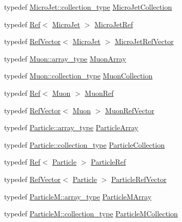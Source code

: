 \begin{DoxyCompactItemize}
\item 
typedef \hyperlink{classpanda_1_1Collection}{MicroJet::collection\_\-type} \hyperlink{namespacepanda_ab230de44162d083734a6dd7d1f290908}{MicroJetCollection}
\item 
typedef \hyperlink{classpanda_1_1Ref}{Ref}$<$ \hyperlink{classpanda_1_1MicroJet}{MicroJet} $>$ \hyperlink{namespacepanda_a31895cc843487337a54b7d314be09f3e}{MicroJetRef}
\item 
typedef \hyperlink{classpanda_1_1RefVector}{RefVector}$<$ \hyperlink{classpanda_1_1MicroJet}{MicroJet} $>$ \hyperlink{namespacepanda_aa1c1fbda38b1106e6f19bcf0834fedd8}{MicroJetRefVector}
\item 
typedef \hyperlink{classpanda_1_1Array}{Muon::array\_\-type} \hyperlink{namespacepanda_a0418ef8ba125b4267656498f328e25a9}{MuonArray}
\item 
typedef \hyperlink{classpanda_1_1Collection}{Muon::collection\_\-type} \hyperlink{namespacepanda_a72e6068ccbb985b2cc5e14fcb5b1dbc4}{MuonCollection}
\item 
typedef \hyperlink{classpanda_1_1Ref}{Ref}$<$ \hyperlink{classpanda_1_1Muon}{Muon} $>$ \hyperlink{namespacepanda_a1f824edce9f63cd83da0fdedbde27588}{MuonRef}
\item 
typedef \hyperlink{classpanda_1_1RefVector}{RefVector}$<$ \hyperlink{classpanda_1_1Muon}{Muon} $>$ \hyperlink{namespacepanda_acbb387f9b6ce80632d841326173e2aa6}{MuonRefVector}
\item 
typedef \hyperlink{classpanda_1_1Array}{Particle::array\_\-type} \hyperlink{namespacepanda_a52395e45df31cb15ccae720f9e67bf50}{ParticleArray}
\item 
typedef \hyperlink{classpanda_1_1Collection}{Particle::collection\_\-type} \hyperlink{namespacepanda_a26c14e36590aae75f00bc3dd8fba58bf}{ParticleCollection}
\item 
typedef \hyperlink{classpanda_1_1Ref}{Ref}$<$ \hyperlink{classpanda_1_1Particle}{Particle} $>$ \hyperlink{namespacepanda_a23b96a64b998bcc29e3d6773dd68d0c5}{ParticleRef}
\item 
typedef \hyperlink{classpanda_1_1RefVector}{RefVector}$<$ \hyperlink{classpanda_1_1Particle}{Particle} $>$ \hyperlink{namespacepanda_ab51d55a6dbee094ae15c5f00e7667693}{ParticleRefVector}
\item 
typedef \hyperlink{classpanda_1_1Array}{ParticleM::array\_\-type} \hyperlink{namespacepanda_a1049a1e05124964724245070cac428d5}{ParticleMArray}
\item 
typedef \hyperlink{classpanda_1_1Collection}{ParticleM::collection\_\-type} \hyperlink{namespacepanda_a1e461f36eeeecf119695e60acf10dbb6}{ParticleMCollection}

\end{DoxyCompactItemize}
